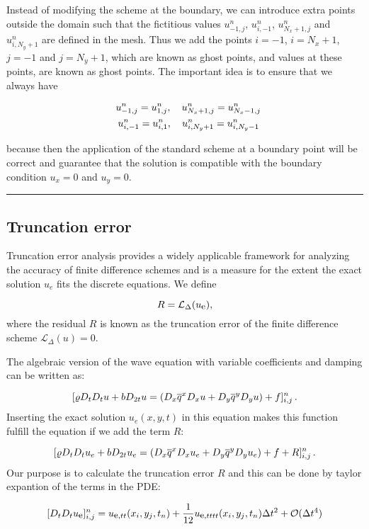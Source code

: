 \documentclass[letterpaper,10pt,english]{/usr/share/sphinx/texinputs/sphinxhowto}
\begin{document}
Instead of modifying the scheme at the boundary, we can introduce extra
points outside the domain such that the fictitious values $u^n_{-1,j}$,
$u^n_{i,-1}$, $u^n_{N_x+1,j}$ and $u^n_{i,N_y+1}$ are defined in the
mesh. Thus we add the points $i=-1$, $i=N_x+1$, $j=-1$ and $j=N_y+1$,
which are known as ghost points, and values at these points, are known
as ghost points. The important idea is to ensure that we always have

\begin{align*}
 u^n_{-1,j}=u^n_{1,j}, \quad u^n_{N_x+1,j}=u^n_{N_x-1,j} \\
\quad u^n_{i,-1}=u^n_{i,1}, \quad u^n_{i,N_y+1}=u^n_{i,N_y-1}
\thinspace 
\end{align*}

because then the application of the standard scheme at a boundary point
will be correct and guarantee that the solution is compatible with the
boundary condition $u_x=0$ and $u_y=0$.\begin{center}\rule{3in}{0.4pt}\end{center}

\subsection{Truncation error}

Truncation error analysis provides a widely applicable framework for
analyzing the accuracy of finite difference schemes and is a measure for
the extent the exact solution $u_e$ fits the discrete equations. We
define

\[
R = \mathcal{L}_\Delta({u_{\small\mbox{e}}}),
\] where the residual $R$ is known as the truncation error of the finite
difference scheme $\mathcal{L}_\Delta(u) = 0$.

The algebraic version of the wave equation with variable coefficients
and damping can be written as:

\[
[\varrho D_tD_t u + b D_{2t} u  = (D_x\overline{q}^x D_x u +
D_y\overline{q}^y D_yu ) + f]^n_{i,j}
\thinspace .
\] Inserting the exact solution $u_e(x,y,t)$ in this equation makes this
function fulfill the equation if we add the term $R$:

\[
[\varrho D_tD_t u_e + b D_{2t} u_e  = (D_x\overline{q}^x D_x u_e +
D_y\overline{q}^y D_yu_e ) + f+ R]^n_{i,j}
\thinspace .
\] Our purpose is to calculate the truncation error $R$ and this can be
done by taylor expantion of the terms in the PDE:

\[ 
[D_t D_t{u_{\small\mbox{e}}}]_{i,j}^n = {u_{\small\mbox{e}, tt}}(x_i,y_j,t_n) +
\frac{1}{12}{u_{\small\mbox{e}, tttt}}(x_i,y_j,t_n)\Delta t^2 + {\mathcal{O}(\Delta t^4)}
\]
\end{document}
